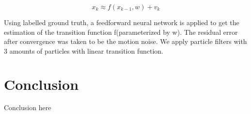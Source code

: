 \documentclass[10pt,twocolumn,letterpaper]{article}
\begin{document}
\begin{equation}
x_k \approx f(x_{k-1},w)+v_k
\end{equation}

Using labelled ground truth, a feedforward neural network is applied to get the estimation of the transition function f(parameterized by w). The residual error after convergence was taken to be the motion noise. We apply particle filters with 3 amounts of particles with linear transition function.



\section{Conclusion}

Conclusion here

\end{document}
